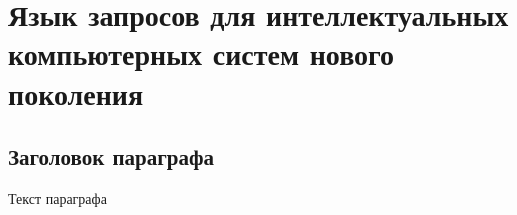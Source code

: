 \chapter{Язык запросов для интеллектуальных компьютерных систем нового поколения}
\label{chapter_requests}


\section{Заголовок параграфа}
Текст параграфа

%